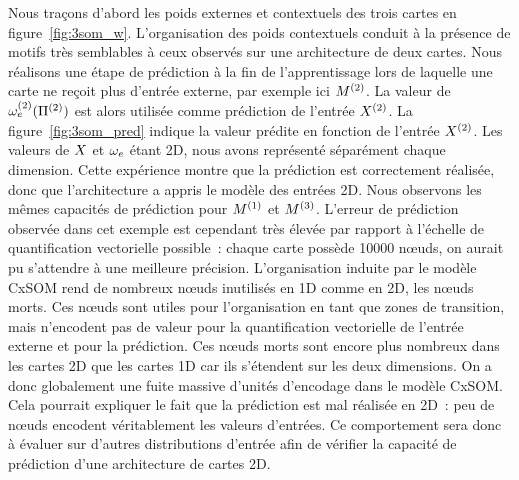 \documentclass[../main]{subfiles}
\begin{document}
Nous traçons d'abord les poids externes et contextuels des trois cartes en figure~\ref{fig:3som_w}.
L'organisation des poids contextuels conduit à la présence de motifs très semblables à ceux observés sur une architecture de deux cartes.
Nous réalisons une étape de prédiction à la fin de l'apprentissage lors de laquelle une carte ne reçoit plus d'entrée externe, par exemple ici $M^{({2})}$.
La valeur de $\omega_{e}^{({2})}(\Pi^{({2})})$ est alors utilisée comme prédiction de l'entrée $X^{({2})}$.
La figure~\ref{fig:3som_pred} indique la valeur prédite en fonction de l'entrée $X^{({2})}$. 
Les valeurs de $X$ et $\omega_e$ étant 2D, nous avons représenté séparément chaque dimension. Cette expérience montre que la prédiction est correctement réalisée, donc que l'architecture a appris le modèle des entrées 2D. Nous observons les mêmes capacités de prédiction pour $M^{({1})}$ et $M^{({3})}$.
L'erreur de prédiction observée dans cet exemple est cependant très élevée par rapport à l'échelle de quantification vectorielle possible~: chaque carte possède 10000 n\oe{}uds, on aurait pu s'attendre à une meilleure précision.
L'organisation induite par le modèle CxSOM rend de nombreux n\oe{}uds inutilisés en 1D comme en 2D, les n\oe{}uds morts. Ces n\oe{}uds sont utiles pour l'organisation en tant que zones de transition, mais n'encodent pas de valeur pour la quantification vectorielle de l'entrée externe et pour la prédiction. Ces n\oe{}uds morts sont encore plus nombreux dans les cartes 2D que les cartes 1D car ils s'étendent sur les deux dimensions. On a donc globalement une fuite massive d'unités d'encodage dans le modèle CxSOM. Cela pourrait expliquer le fait que la prédiction est mal réalisée en 2D~: peu de n\oe{}uds encodent véritablement les valeurs d'entrées.
Ce comportement sera donc à évaluer sur d'autres distributions d'entrée afin de vérifier la capacité de prédiction d'une architecture de cartes 2D.
\end{document}
